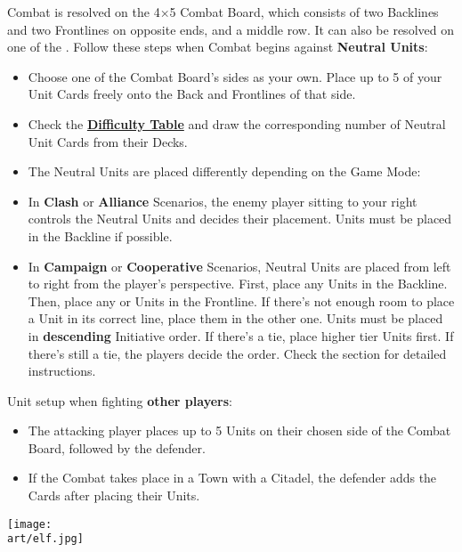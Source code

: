\begin{multicols*}{2}

Combat is resolved on the 4×5 Combat Board, which consists of two Backlines and two Frontlines on opposite ends, and a middle row.
It can also be resolved on one of the .
Follow these steps when Combat begins against \textbf{Neutral Units}:

\begin{itemize}
  \item Choose one of the Combat Board's sides as your own. Place up to 5 of your Unit Cards freely onto the Back and Frontlines of that side.
  \item Check the \hyperlink{Difficulty Table}{\textbf{Difficulty Table}} \iftoggle{printable}{(on the back cover)}{} and draw the corresponding number of Neutral Unit Cards from their Decks.
  \item The Neutral Units are placed differently depending on the Game Mode:
  \item In \textbf{Clash} or \textbf{Alliance} Scenarios, the enemy player sitting to your right controls the Neutral Units and decides their placement.  Units must be placed in the Backline if possible.
  \item {}In \textbf{Campaign} or \textbf{Cooperative} Scenarios, Neutral Units are placed from left to right from the player's perspective.
First, place any  Units in the Backline.
Then, place any  or  Units in the Frontline.
If there's not enough room to place a Unit in its correct line, place them in the other one.
Units must be placed in \textbf{descending} Initiative order.
If there's a tie, place higher tier Units first.
If there's still a tie, the players decide the order.
Check the  section for detailed instructions.
\end{itemize}

Unit setup when fighting \textbf{other players}:
\begin{itemize}
  \item The attacking player places up to 5 Units on their chosen side of the Combat Board, followed by the defender.
  \item If the Combat takes place in a Town with a Citadel, the defender adds the  Cards after placing their Units.
  \vspace*{-4em}
\end{itemize}

\begin{center}
  \texttt{[image: \\art/elf.jpg]}
\end{center}
\end{multicols*}

